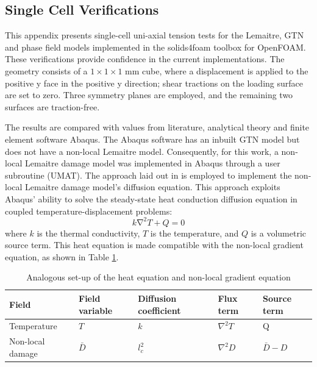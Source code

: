 \documentclass[sn-mathphys,Numbered]{sn-jnl}%
\begin{document}
\begin{appendices}

\section{Single Cell Verifications} \label{app:one_cell}
This appendix presents single-cell uni-axial tension tests for the Lemaitre, GTN and phase field models implemented in the solids4foam toolbox for OpenFOAM.
These verifications provide confidence in the current implementations.
The geometry consists of a $1\times1\times1$ mm cube, where a displacement is applied to the positive y face in the positive y direction; shear tractions on the loading surface are set to zero.
Three symmetry planes are employed, and the remaining two surfaces are traction-free.

The results are compared with values from literature, analytical theory and finite element software Abaqus.
The Abaqus software has an inbuilt GTN model but does not have a non-local Lemaitre model.
Consequently, for this work, a non-local Lemaitre damage model was implemented in Abaqus through a user subroutine (UMAT).
The approach laid out in \citet{azinpour_simple_2018} is employed to implement the non-local Lemaitre damage model's diffusion equation.
This approach exploits Abaqus' ability to solve the steady-state heat conduction diffusion equation in coupled temperature-displacement problems:
\begin{equation}
    k\mathrm{\nabla}^2T + Q = 0
\end{equation}
where $k$ is the thermal conductivity, $T$ is the temperature, and $Q$ is a volumetric source term.
This heat equation is made compatible with the non-local gradient equation, as shown in Table \ref{tab:diffusion_equation_comparison}.
\begin{table}[htb]
	\centering
		\begin{tabular}{lllll} \hline
			Field & Field variable & Diffusion coefficient & Flux term & Source term \\ \hline 
			Temperature & $T$ & $k$ & $\nabla^2T$ & Q \\
			Non-local damage & $\bar{D}$ & $l^{2}_c$ & $\nabla^2D$ &  $\bar{D}-D$\\
            \hline
		\end{tabular}
	\caption{Analogous set-up of the heat equation and non-local gradient equation}
	\label{tab:diffusion_equation_comparison}
\end{table}




\end{appendices}
\end{document}
